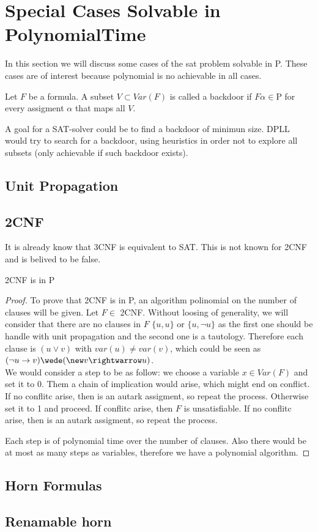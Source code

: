 \newpage

\section{Special Cases Solvable in PolynomialTime}


In this section we will discuss some cases of the sat problem solvable in P. These cases are of interest because polynomial is no achievable in all cases.

\begin{definition}
  Let $F$ be a formula. A subset $ V \subset Var(F)$ is called a backdoor if $F\alpha \in \text{P}$ for every assigment $\alpha$ that maps all $V$.
\end{definition}
A goal for a SAT-solver could be to find a backdoor of minimun size. DPLL would try to search for a backdoor, using heuristics in order not to explore all subsets (only achievable if such backdoor exists).
\subsection{Unit Propagation}


\subsection{2CNF}
It is already know that 3CNF is equivalent to SAT. This is not known for 2CNF and is belived to be false.

\begin{proposition}
  2CNF is in P 
\end{proposition}
\begin{proof}

  To prove that 2CNF is in P, an algorithm polinomial on the number of clauses will be given. Let $F \in$ 2CNF.  Without loosing of generality, we will consider that there are no clauses in $F$ $\{u,u\}$ or $\{u,\neg u\}$ as the first one should be handle with unit propagation and the second one is a tautology. Therefore each clause is $(u \vee v)$ with $var(u) \ne var(v)$, which could be seen as $(\neg u \rightarrow v) \wede (\new v \rightwarrow u)$.\\


  
  We would consider a step to be as follow: we choose a variable $x \in Var(F)$ and set it to 0. Them a chain of implication would arise, which might end on conflict. If no conflitc arise, then is an autark assigment, so repeat the process. Otherwise set it to 1 and proceed. If conflitc arise, then $F$ is unsatisfiable. If no conflitc arise, then is an autark assigment, so repeat the process.
  

  Each step is of polynomial time over the number of clauses. Also there would be at most as many steps as variables, therefore we have a polynomial algorithm.
  
  
\end{proof}

\subsection{Horn Formulas}
\subsection{Renamable horn}


